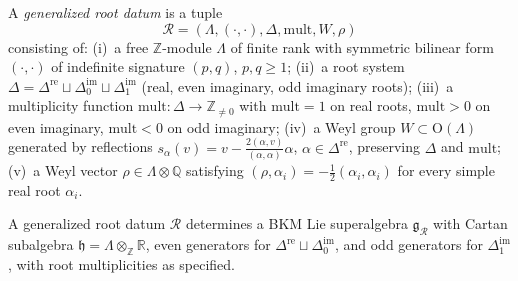 \begin{definition}
\label{def:thy-grd-generalized-root-datum}
A \emph{generalized root datum} is a tuple
\[
\mathcal{R}=(\Lambda,(\cdot,\cdot),\Delta,\mathrm{mult},W,\rho)
\]
consisting of: (i)~a free $\mathbb{Z}$-module $\Lambda$ of finite rank with
symmetric bilinear form $(\cdot,\cdot)$ of indefinite signature $(p,q)$,
$p,q\geq 1$; (ii)~a root system $\Delta=\Delta^{\mathrm{re}}\sqcup
\Delta^{\mathrm{im}}_0\sqcup\Delta^{\mathrm{im}}_1$ (real, even imaginary,
odd imaginary roots); (iii)~a multiplicity function
$\mathrm{mult}\colon\Delta\to\mathbb{Z}_{\ne 0}$ with $\mathrm{mult}=1$ on
real roots, $\mathrm{mult}>0$ on even imaginary, $\mathrm{mult}<0$ on odd
imaginary; (iv)~a Weyl group $W\subset\mathrm{O}(\Lambda)$ generated by
reflections $s_\alpha(v)=v-\frac{2(\alpha,v)}{(\alpha,\alpha)}\alpha$,
$\alpha\in\Delta^{\mathrm{re}}$, preserving $\Delta$ and $\mathrm{mult}$;
(v)~a Weyl vector $\rho\in\Lambda\otimes\mathbb{Q}$ satisfying
$(\rho,\alpha_i)=-\frac{1}{2}(\alpha_i,\alpha_i)$ for every simple real root
$\alpha_i$.

A generalized root datum $\mathcal{R}$ determines a BKM Lie superalgebra
$\mathfrak{g}_\mathcal{R}$ with Cartan subalgebra $\mathfrak{h}=\Lambda\otimes_\mathbb{Z}\mathbb{R}$,
even generators for $\Delta^{\mathrm{re}}\sqcup\Delta^{\mathrm{im}}_0$, and
odd generators for $\Delta^{\mathrm{im}}_1$, with root multiplicities as
specified.
\end{definition}

